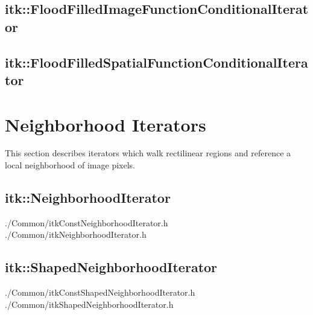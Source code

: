 %

\subsection{itk::FloodFilledImageFunctionConditionalIterator}
\label{itk::FloodFilledImageFunctionConditionalIterator}


\subsection{itk::FloodFilledSpatialFunctionConditionalIterator}
\label{itk::FloodFilledSpatialFunctionConditionalIterator}


\section{Neighborhood Iterators}
\label{sec:NeighborhoodIterators}
This section describes iterators which walk rectilinear regions and reference a
local neighborhood of image pixels.




\subsection{itk::NeighborhoodIterator}
\label{sec:itkNeighborhoodIterator}
./Common/itkConstNeighborhoodIterator.h
./Common/itkNeighborhoodIterator.h

\subsection{itk::ShapedNeighborhoodIterator}
\label{sec:itkShapedNeighborhoodIterator}
./Common/itkConstShapedNeighborhoodIterator.h
./Common/itkShapedNeighborhoodIterator.h






















